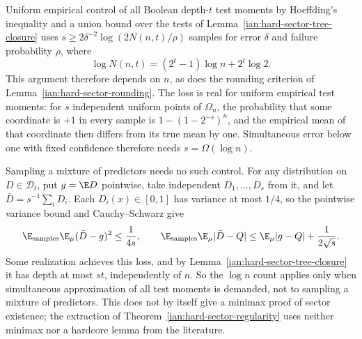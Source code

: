 \begin{remark}
\label{ian:hard-sector-minimax-sampling}
Uniform empirical control of all Boolean depth-\(t\) test moments by
Hoeffding's inequality and a union bound over the tests of
Lemma~\ref{ian:hard-sector-tree-closure} uses
\(s\ge2\delta^{-2}\log(2N(n,t)/\rho)\) samples for error \(\delta\) and
failure probability \(\rho\), where
\[
 \log N(n,t)=(2^t-1)\log n+2^t\log2.
\]
This argument therefore depends on \(n\), as does the rounding criterion
of Lemma~\ref{ian:hard-sector-rounding}. The loss is real for uniform
empirical test moments: for \(s\) independent uniform points of
\(\Omega_n\), the probability that some coordinate is \(+1\) in every
sample is \(1-(1-2^{-s})^n\), and the empirical mean of that coordinate
then differs from its true mean by one. Simultaneous error below one with
fixed confidence therefore needs \(s=\Omega(\log n)\).

Sampling a mixture of predictors needs no such control. For any
distribution on \(D\in\mathcal D_t\), put \(g=\E D\) pointwise, take
independent \(D_1,\ldots,D_s\) from it, and let
\(\bar D=s^{-1}\sum_iD_i\). Each \(D_i(x)\in[0,1]\) has variance at most
\(1/4\), so the pointwise variance bound and Cauchy--Schwarz give
\[
 \E_{\mathrm{samples}}\E_\mu(\bar D-g)^2\le\frac1{4s},\qquad
 \E_{\mathrm{samples}}\E_\mu|\bar D-Q|
 \le\E_\mu|g-Q|+\frac1{2\sqrt s}.
\]
Some realization achieves this loss, and by
Lemma~\ref{ian:hard-sector-tree-closure} it has depth at most \(st\),
independently of \(n\). So the \(\log n\) count applies only when
simultaneous approximation of all test moments is demanded, not to
sampling a mixture of predictors. This does not by itself give a minimax
proof of sector existence; the extraction of
Theorem~\ref{ian:hard-sector-regularity} uses neither minimax nor a
hardcore lemma from the literature.
\end{remark}
